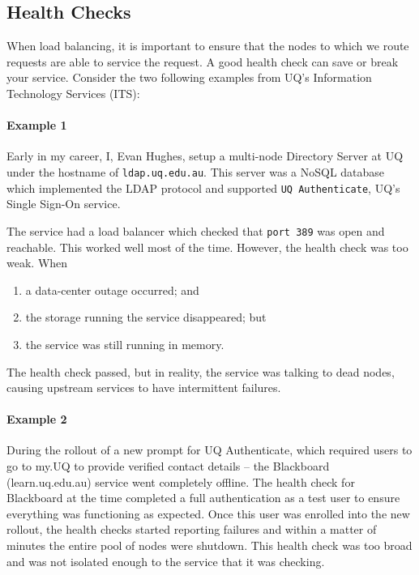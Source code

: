 \documentclass{csse4400}
\begin{document}
\subsection{Health Checks}

When load balancing, it is important to ensure that the nodes to which we route requests are able to service the request.
A good health check can save or break your service.
Consider the two following examples from UQ's Information Technology Services (ITS):

\paragraph{Example 1} Early in my career, I, Evan Hughes, setup a multi-node Directory Server at UQ under the hostname of \texttt{ldap.uq.edu.au}.
This server was a NoSQL database which implemented the LDAP protocol and supported \texttt{UQ Authenticate},
UQ's Single Sign-On service.

The service had a load balancer which checked that \texttt{port 389} was open and reachable. 
This worked well most of the time.
However, the health check was too weak. When
\begin{enumerate} 
    \item a data-center outage occurred; and
    \item the storage running the service disappeared; but 
    \item the service was still running in memory.
\end{enumerate}

\noindent
The health check passed, but in reality, the service was talking to dead nodes, causing upstream services to have intermittent failures. 

\paragraph{Example 2} During the rollout of a new prompt for UQ Authenticate, which required users to go to my.UQ to provide verified contact details -- the Blackboard (learn.uq.edu.au) service went completely offline.
The health check for Blackboard at the time completed a full authentication as a test user to ensure everything was functioning as expected.
Once this user was enrolled into the new rollout,
the health checks started reporting failures and within a matter of minutes the entire pool of nodes were shutdown.
This health check was too broad and was not isolated enough to the service that it was checking.\\
\end{document}
